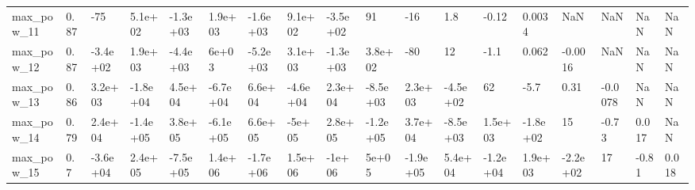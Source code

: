 \begin{tabular}{llllllllllllllllll}
max\_pow\_11 & 0.87 &      -75 &  5.1e+02 & -1.3e+03 &  1.9e+03 & -1.6e+03 &  9.1e+02 & -3.5e+02 &       91 &      -16 &      1.8 &    -0.12 &   0.0034 &      NaN &     NaN &   NaN &   NaN \\
max\_pow\_12 & 0.87 & -3.4e+02 &  1.9e+03 & -4.4e+03 &    6e+03 & -5.2e+03 &  3.1e+03 & -1.3e+03 &  3.8e+02 &      -80 &       12 &     -1.1 &    0.062 &  -0.0016 &     NaN &   NaN &   NaN \\
max\_pow\_13 & 0.86 &  3.2e+03 & -1.8e+04 &  4.5e+04 & -6.7e+04 &  6.6e+04 & -4.6e+04 &  2.3e+04 & -8.5e+03 &  2.3e+03 & -4.5e+02 &       62 &     -5.7 &     0.31 & -0.0078 &   NaN &   NaN \\
max\_pow\_14 & 0.79 &  2.4e+04 & -1.4e+05 &  3.8e+05 & -6.1e+05 &  6.6e+05 &   -5e+05 &  2.8e+05 & -1.2e+05 &  3.7e+04 & -8.5e+03 &  1.5e+03 & -1.8e+02 &       15 &   -0.73 & 0.017 &   NaN \\
max\_pow\_15 &  0.7 & -3.6e+04 &  2.4e+05 & -7.5e+05 &  1.4e+06 & -1.7e+06 &  1.5e+06 &   -1e+06 &    5e+05 & -1.9e+05 &  5.4e+04 & -1.2e+04 &  1.9e+03 & -2.2e+02 &      17 & -0.81 & 0.018 \\
\bottomrule
\end{tabular}
